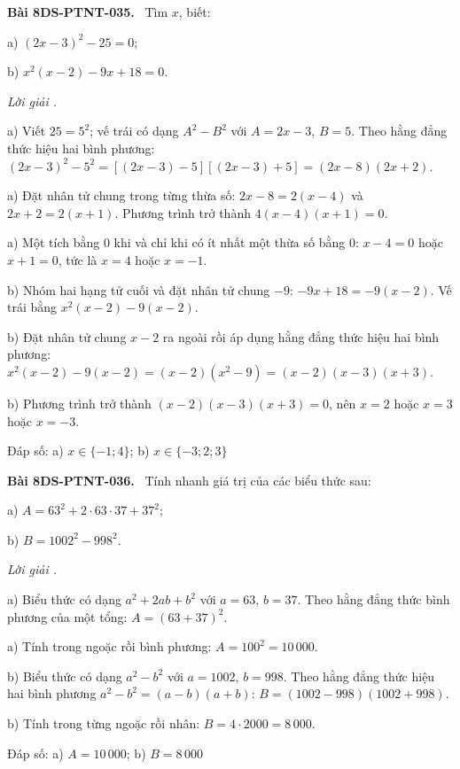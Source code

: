 \documentclass[12pt,a4paper]{article}
\newenvironment{problem}[1][]{\par\medskip\noindent\textbf{Bài #1.}\ }{\par}
\newenvironment{solution}[1][]{\par\noindent\textit{Lời giải #1.}\par}{\par}
\begin{document}
\begin{problem}[8DS-PTNT-035]
Tìm $x$, biết:

a) $(2x - 3)^2 - 25 = 0$;

b) $x^2(x - 2) - 9x + 18 = 0$.

\begin{solution}
a) Viết $25 = 5^2$; vế trái có dạng $A^2 - B^2$ với $A = 2x - 3$, $B = 5$. Theo hằng đẳng thức hiệu hai bình phương: $(2x - 3)^2 - 5^2 = \left[(2x - 3) - 5\right]\left[(2x - 3) + 5\right] = (2x - 8)(2x + 2)$.

a) Đặt nhân tử chung trong từng thừa số: $2x - 8 = 2(x - 4)$ và $2x + 2 = 2(x + 1)$. Phương trình trở thành $4(x - 4)(x + 1) = 0$.

a) Một tích bằng $0$ khi và chỉ khi có ít nhất một thừa số bằng $0$: $x - 4 = 0$ hoặc $x + 1 = 0$, tức là $x = 4$ hoặc $x = -1$.

b) Nhóm hai hạng tử cuối và đặt nhân tử chung $-9$: $-9x + 18 = -9(x - 2)$. Vế trái bằng $x^2(x - 2) - 9(x - 2)$.

b) Đặt nhân tử chung $x - 2$ ra ngoài rồi áp dụng hằng đẳng thức hiệu hai bình phương: $x^2(x - 2) - 9(x - 2) = (x - 2)(x^2 - 9) = (x - 2)(x - 3)(x + 3)$.

b) Phương trình trở thành $(x - 2)(x - 3)(x + 3) = 0$, nên $x = 2$ hoặc $x = 3$ hoặc $x = -3$.

Đáp số: a) $\boxed{x \in \{-1; 4\}}$; b) $\boxed{x \in \{-3; 2; 3\}}$
\end{solution}
\end{problem}

\begin{problem}[8DS-PTNT-036]
Tính nhanh giá trị của các biểu thức sau:

a) $A = 63^2 + 2 \cdot 63 \cdot 37 + 37^2$;

b) $B = 1002^2 - 998^2$.

\begin{solution}
a) Biểu thức có dạng $a^2 + 2ab + b^2$ với $a = 63$, $b = 37$. Theo hằng đẳng thức bình phương của một tổng: $A = (63 + 37)^2$.

a) Tính trong ngoặc rồi bình phương: $A = 100^2 = 10\,000$.

b) Biểu thức có dạng $a^2 - b^2$ với $a = 1002$, $b = 998$. Theo hằng đẳng thức hiệu hai bình phương $a^2 - b^2 = (a - b)(a + b)$: $B = (1002 - 998)(1002 + 998)$.

b) Tính trong từng ngoặc rồi nhân: $B = 4 \cdot 2000 = 8\,000$.

Đáp số: a) $\boxed{A = 10\,000}$; b) $\boxed{B = 8\,000}$
\end{solution}
\end{problem}
\end{document}
